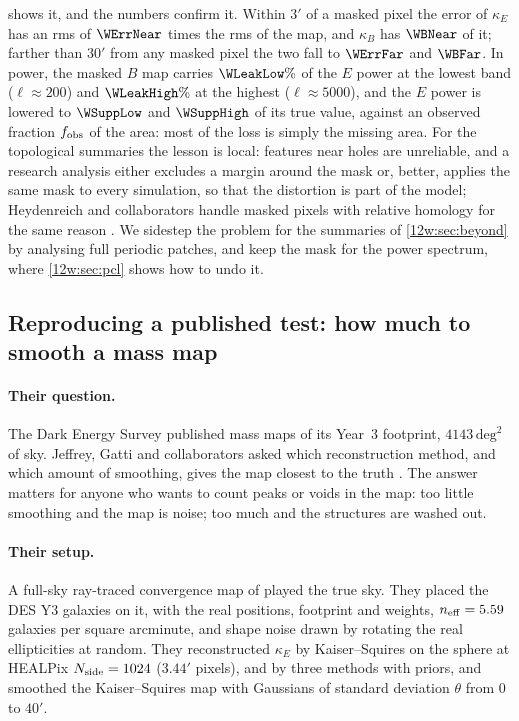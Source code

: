  shows it, and the numbers confirm it. Within $3'$ of a masked pixel the error of $\kappa_E$
has an rms of $\WErrNear$ times the rms of the map, and $\kappa_B$ has $\WBNear$ of it; farther than $30'$ from any
masked pixel the two fall to $\WErrFar$ and $\WBFar$. In power, the masked $B$ map carries $\WLeakLow\%$ of the $E$
power at the lowest band ($\ell\approx200$) and $\WLeakHigh\%$ at the highest ($\ell\approx5000$), and the $E$ power
is lowered to $\WSuppLow$ and $\WSuppHigh$ of its true value, against an observed fraction $f_{\rm obs}$ of the area: most of the loss is simply the
missing area. For the topological summaries the lesson is local: features near holes are unreliable, and a
research analysis either excludes a margin around the mask or, better, applies the same mask to every simulation, so
that the distortion is part of the model; Heydenreich and collaborators handle masked pixels with relative homology
for the same reason \cite[§2.3.3]{Heydenreich2021}. We sidestep the problem for the summaries of
\cref{12w:sec:beyond} by analysing full periodic patches, and keep the mask for the power spectrum, where
\cref{12w:sec:pcl} shows how to undo it.

\subsection{Reproducing a published test: how much to smooth a mass map}
\label{12w:sec:jeffrey}

\paragraph{Their question.} The Dark Energy Survey published mass maps of its Year~3 footprint, $4143\,\mathrm{deg}^2$
of sky. Jeffrey, Gatti and collaborators asked which reconstruction method, and which amount of smoothing, gives
the map closest to the truth \cite{Jeffrey2021DESmass}. The answer matters for anyone who wants to count peaks or
voids in the map: too little smoothing and the map is noise; too much and the structures are washed out.

\paragraph{Their setup.} A full-sky ray-traced convergence map of \cite{Takahashi2017sims} played the true sky. They
placed the DES Y3 galaxies on it, with the real positions, footprint and weights, $n_{\rm eff}=5.59$ galaxies per
square arcminute, and shape noise drawn by rotating the real ellipticities at random. They reconstructed $\kappa_E$
by Kaiser--Squires on the sphere at HEALPix $N_{\rm side}=1024$ ($3.44'$ pixels), and by three methods with priors,
and smoothed the Kaiser--Squires map with Gaussians of standard deviation $\theta$ from $0$ to $40'$.

